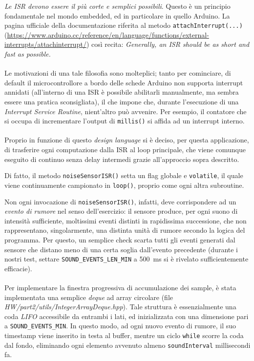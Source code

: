 \documentclass[12pt,a4paper]{article}
\begin{document}
\textit{Le ISR devono essere il più corte e semplici possibili}. Questo è un principio fondamentale nel mondo embedded, ed in particolare in quello Arduino. La pagina ufficiale della documentazione riferita al metodo \verb|attachInterrupt(...)| (\url{https://www.arduino.cc/reference/en/language/functions/external-interrupts/attachinterrupt/}) così recita: \textit{Generally, an ISR should be as short and fast as possible.}
\\ \\
Le motivazioni di una tale filosofia sono molteplici; tanto per cominciare, di default il microcontrollore a bordo delle schede Arduino non supporta interrupt annidati (all'interno di una ISR è possibile abilitarli manualmente, ma sembra essere una pratica sconsigliata), il che impone che, durante l'esecuzione di una \textit{Interrupt Service Routine}, nient'altro può avvenire. Per esempio, il contatore che si occupa di incrementare l'output di \verb|millis()| si affida ad un interrupt interno.
\\ \\
Proprio in funzione di questo \textit{design language} si è deciso, per questa applicazione, di trasferire ogni computazione dalla ISR al loop principale, che viene comunque eseguito di continuo senza delay intermedi grazie all'approccio sopra descritto.

Di fatto, il metodo \verb|noiseSensorISR()| setta un flag globale e \verb|volatile|, il quale viene continuamente campionato in \verb|loop()|, proprio come ogni altra subroutine.

Non ogni invocazione di \verb|noiseSensorISR()|, infatti, deve corrispondere ad un \textit{evento di rumore} nel senso dell'esercizio: il sensore produce, per ogni suono di intensità sufficiente, moltissimi eventi distinti in rapidissima successione, che non rappresentano, singolarmente, una distinta unità di rumore secondo la logica del programma. Per questo, un semplice check scarta tutti gli eventi generati dal sensore che distano meno di una certa soglia dall'evento precedente (durante i nostri test, settare \verb|SOUND_EVENTS_LEN_MIN| a \SI{500}{\milli\second} si è rivelato sufficientemente efficacie).
\\ \\
Per implementare la finestra progressiva di accumulazione dei sample, è stata implementata una semplice \textit{deque} ad array circolare (file \textit{HW/part2/utils/IntegerArrayDeque.hpp}). Tale struttura è essenzialmente una coda \textit{LIFO} accessibile da entrambi i lati, ed inizializzata con una dimensione pari a \verb|SOUND_EVENTS_MIN|. In questo modo, ad ogni nuovo evento di rumore, il suo timestamp viene inserito in testa al buffer, mentre un ciclo \verb|while| scorre la coda dal fondo, eliminando ogni elemento avvenuto almeno \verb|soundInterval| millisecondi fa.
\end{document}
